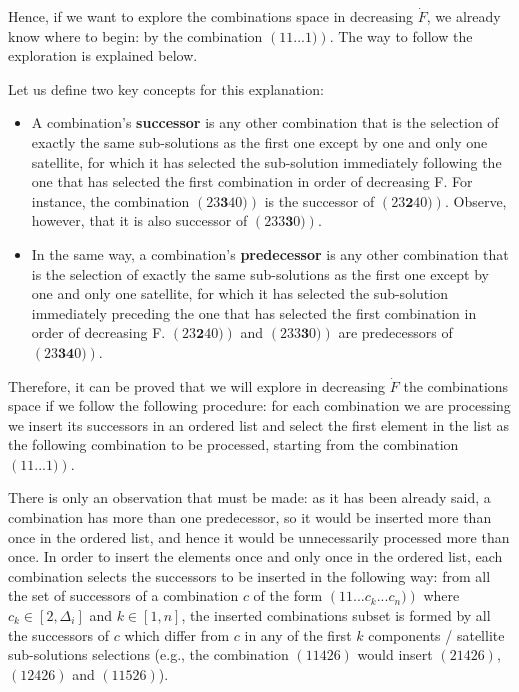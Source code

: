 Hence, if we want to explore the combinations space in decreasing $\dot{F}$, we already know where to begin: by the combination $\left(1 1 ... 1)\right)$. The way to follow the exploration is explained below.

Let us define two key concepts for this explanation:
\begin{itemize}
\item A combination's \textbf{successor} is any other combination that is the selection of exactly the same sub-solutions as the first one except by one and only one satellite, for which it has selected the sub-solution immediately following the one that has selected the first combination in order of decreasing F. For instance, the combination $\left(2 3 \mathbf{3} 4 0)\right)$ is the successor of $\left(2 3 \mathbf{2} 4 0)\right)$. Observe, however, that it is also successor of $\left(2 3 3 \mathbf{3} 0)\right)$.
\item In the same way, a combination's \textbf{predecessor} is any other combination that is the selection of exactly the same sub-solutions as the first one except by one and only one satellite, for which it has selected the sub-solution immediately preceding the one that has selected the first combination in order of decreasing F. $\left(2 3 \mathbf{2} 4 0)\right)$ and $\left(2 3 3 \mathbf{3} 0)\right)$ are predecessors of $\left(2 3 \mathbf{3 4} 0)\right)$.
\end{itemize}

Therefore, it can be proved that we will explore in decreasing $\dot{F}$ the combinations space if we follow the following procedure: for each combination we are processing we insert its successors in an ordered list and select the first element in the list as the following combination to be processed, starting from the combination $\left(1 1 ... 1)\right)$.

There is only an observation that must be made: as it has been already said, a combination has more than one predecessor, so it would be inserted more than once in the ordered list, and hence it would be unnecessarily processed more than once. In order to insert the elements once and only once in the ordered list, each combination selects the successors to be inserted in the following way: from all the set of successors of a combination $c$ of the form $\left(1 1 ... c_k ... c_n)\right)$ where $c_k \in [2, \Delta_i]$ and $k \in [1,n]$, the inserted combinations subset is formed by all the successors of $c$ which differ from $c$ in any of the first $k$ components / satellite sub-solutions selections (e.g., the combination $(1 1 4 2 6)$ would insert $(2 1 4 2 6)$, $(1 2 4 2 6)$ and $(1 1 5 2 6)$).

